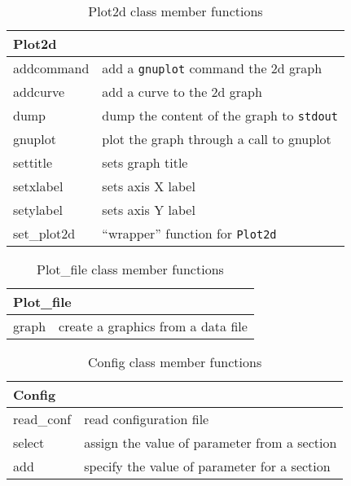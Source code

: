 \documentclass[dvips,11pt,fleqn]{report}
\begin{document}
\begin{table}[htbp]
\caption{Plot2d class member functions}
\label{tab:commandsum1j}
\begin{center}
\begin{tabular}{||l|l||}
\hline
\hline
\multicolumn{2}{||l||}{{\bf Plot2d}} \\
\hline
\hline
addcommand & add a {\tt gnuplot} command the 2d graph \\
\hline
addcurve & add a curve to the 2d graph \\
\hline
dump & dump the content of the graph to {\tt stdout} \\
\hline
gnuplot & plot the graph through a call to \textsf{gnuplot} \\
\hline
settitle & sets graph title  \\
\hline
setxlabel & sets axis X label \\
\hline
setylabel & sets axis Y label \\
\hline
set\_plot2d & ``wrapper'' function for \texttt{Plot2d} \\
\hline
\hline
\end{tabular}
\end{center}
\end{table}

\begin{table}[htbp]
\caption{Plot\_file class member functions}
\label{tab:commandsum1k}
\begin{center}
\begin{tabular}{||l|l||}
\hline
\hline
\multicolumn{2}{||l||}{{\bf Plot\_file}} \\
\hline
\hline
graph & create a graphics from a data file \\
\hline
\hline
\end{tabular}
\end{center}
\end{table}

\begin{table}[htbp]
\caption{Config class member functions}
\label{tab:commandsum1l}
\begin{center}
\begin{tabular}{||l|l||}
\hline
\hline
\multicolumn{2}{||l||}{{\bf Config}} \\
\hline
\hline
read\_conf & read configuration file \\
\hline
select & assign the value of parameter from a section  \\
\hline
add & specify the value of parameter for a section  \\
\hline
\hline
\end{tabular}
\end{center}
\end{table}
\end{document}
